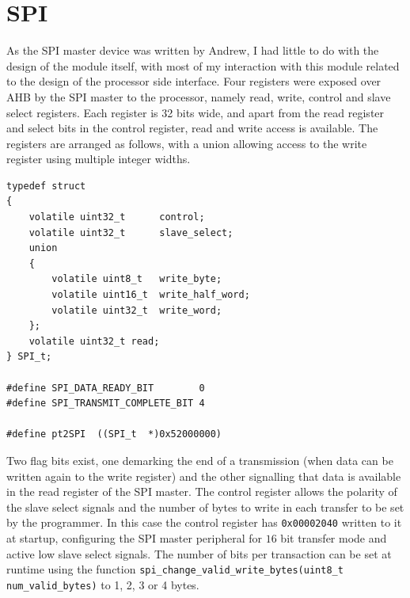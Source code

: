 \documentclass[11pt,british]{report}
\begin{document}
\section*{SPI}
As the SPI master device was written by Andrew, I had little to do with the design of the module itself, with most of my interaction with this module related to the design of the processor side interface. Four registers were exposed over AHB by the SPI master to the processor, namely read, write, control and slave select registers. Each register is 32 bits wide, and apart from the read register and select bits in the control register, read and write access is available. The registers are arranged as follows, with a union allowing access to the write register using multiple integer widths.
\begin{lstlisting}[style={c-style}]
typedef struct
{
	volatile uint32_t      control;
	volatile uint32_t      slave_select;
	union
	{
		volatile uint8_t   write_byte;
		volatile uint16_t  write_half_word;
		volatile uint32_t  write_word;
	};
	volatile uint32_t read;
} SPI_t;

#define SPI_DATA_READY_BIT        0
#define SPI_TRANSMIT_COMPLETE_BIT 4

#define pt2SPI  ((SPI_t  *)0x52000000)
\end{lstlisting}

Two flag bits exist, one demarking the end of a transmission (when data can be written again to the write register) and the other signalling that data is available in the read register of the SPI master. The control register allows the polarity of the slave select signals and the number of bytes to write in each transfer to be set by the programmer. In this case the control register has \texttt{0x00002040} written to it at startup, configuring the SPI master peripheral for $16$ bit transfer mode and active low slave select signals. The number of bits per transaction can be set at runtime using the function \lstinline[style={c-style}]|spi_change_valid_write_bytes(uint8_t num_valid_bytes)| to 1, 2, 3 or 4 bytes.
\end{document}
